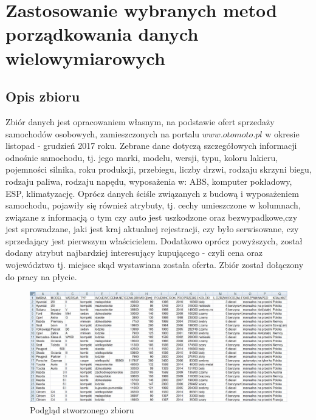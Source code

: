 \documentclass[12pt,a4paper]{report}
\begin{document}
\chapter{Zastosowanie wybranych metod porządkowania danych wielowymiarowych}\label{Zastosowanie}



\section{Opis zbioru}

Zbiór danych jest opracowaniem własnym, na podstawie ofert sprzedaży samochodów osobowych, zamieszczonych na portalu $www.otomoto.pl$ w okresie listopad - grudzień 2017 roku. Zebrane dane dotyczą szczegółowych informacji odnośnie samochodu, tj. jego marki, modelu, wersji, typu, koloru lakieru, pojemności silnika, roku produkcji, przebiegu, liczby drzwi, rodzaju skrzyni biegu, rodzaju paliwa, rodzaju napędu, wyposażenia w: ABS, komputer pokładowy, ESP, klimatyzację. Oprócz danych ściśle związanych z budową i wyposażeniem samochodu, pojawiły się również atrybuty, tj. cechy umieszczone w kolumnach, związane z informacją o tym czy auto jest uszkodzone oraz bezwypadkowe,czy jest sprowadzane, jaki jest kraj aktualnej rejestracji, czy było serwisowane, czy sprzedający jest pierwszym właścicielem. Dodatkowo oprócz powyższych, został dodany atrybut najbardziej interesujący kupującego - czyli cena oraz województwo tj. miejsce skąd wystawiana została oferta. Zbiór został dołączony do pracy na płycie. 
\begin{figure}[h]
\centering
\includegraphics[width=1\textwidth]{img/zbior3.jpg}
\caption{Podgląd stworzonego zbioru}
\label{fig:obrazek1}
\end{figure}
\end{document}
